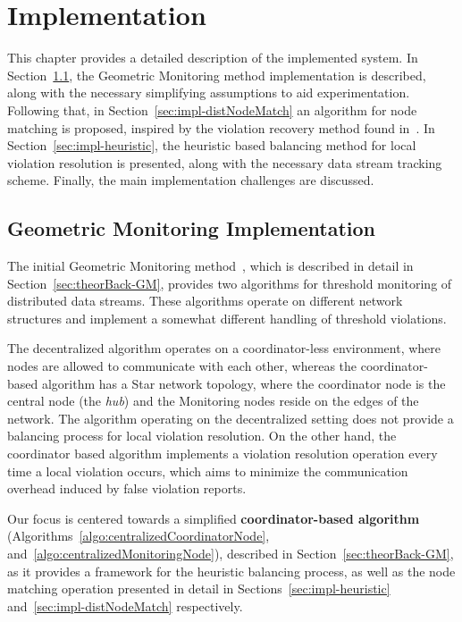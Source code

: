 \chapter{Implementation} \label{chap:impl}

This chapter provides a detailed description of the implemented system. In Section~\ref{sec:impl-GM}, the Geometric Monitoring method implementation is described, along with the necessary simplifying assumptions to aid experimentation. Following that, in Section~\ref{sec:impl-distNodeMatch} an algorithm for node matching is proposed, inspired by the violation recovery method found in~\cite{Keren2014GMHetStreams}. In Section~\ref{sec:impl-heuristic}, the heuristic based balancing method for local violation resolution is presented, along with the necessary data stream tracking scheme. Finally, the main implementation challenges are discussed.

\section{Geometric Monitoring Implementation} \label{sec:impl-GM}

The initial Geometric Monitoring method~\cite{Sharfman2006GM}, which is described in detail in Section~\ref{sec:theorBack-GM}, provides two algorithms for threshold monitoring of distributed data streams. These algorithms operate on different network structures and implement a somewhat different handling of threshold violations.

The decentralized algorithm operates on a coordinator-less environment, where nodes are allowed to communicate with each other, whereas the coordinator-based algorithm has a Star network topology, where the coordinator node is the central node (the \emph{hub}) and the Monitoring nodes reside on the edges of the network.
The algorithm operating on the decentralized setting does not provide a balancing process for local violation resolution. On the other hand, the coordinator based algorithm implements a violation resolution operation every time a local violation occurs, which aims to minimize the communication overhead induced by false violation reports. 

Our focus is centered towards a simplified \textbf{coordinator-based algorithm} (Algorithms~\ref{algo:centralizedCoordinatorNode},  and~\ref{algo:centralizedMonitoringNode}), described in Section~\ref{sec:theorBack-GM}, as it provides a framework for the heuristic balancing process, as well as the node matching operation presented in detail in Sections~\ref{sec:impl-heuristic} and~\ref{sec:impl-distNodeMatch} respectively.

